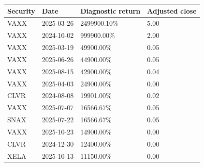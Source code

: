 \begin{tabular}{@{}llll@{}}
\toprule
Security & Date & Diagnostic return & Adjusted close \\
\midrule
VAXX & 2025-03-26 & 2499900.10\% & 5.00 \\
VAXX & 2024-10-02 & 999900.00\% & 2.00 \\
VAXX & 2025-03-19 & 49900.00\% & 0.05 \\
VAXX & 2025-06-26 & 44900.00\% & 0.05 \\
VAXX & 2025-08-15 & 42900.00\% & 0.04 \\
VAXX & 2025-04-03 & 24900.00\% & 0.00 \\
CLVR & 2024-08-08 & 19901.00\% & 0.02 \\
VAXX & 2025-07-07 & 16566.67\% & 0.05 \\
SNAX & 2025-07-22 & 16566.67\% & 0.05 \\
VAXX & 2025-10-23 & 14900.00\% & 0.00 \\
CLVR & 2024-12-30 & 12400.00\% & 0.00 \\
XELA & 2025-10-13 & 11150.00\% & 0.00 \\
\bottomrule
\end{tabular}
